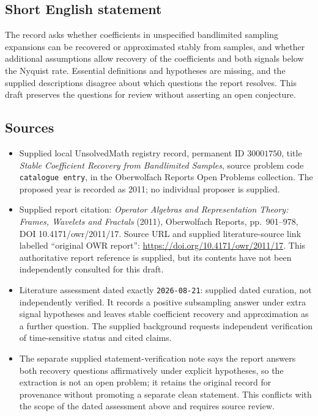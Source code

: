 \documentclass[11pt]{article}
\begin{document}
\subsection{Short English statement}
The record asks whether coefficients in unspecified bandlimited sampling expansions can be recovered or approximated stably from samples, and whether additional assumptions allow recovery of the coefficients and both signals below the Nyquist rate. Essential definitions and hypotheses are missing, and the supplied descriptions disagree about which questions the report resolves. This draft preserves the questions for review without asserting an open conjecture.
\subsection{Sources}
\begin{itemize}
\item Supplied local UnsolvedMath registry record, permanent ID \(30001750\), title \emph{Stable Coefficient Recovery from Bandlimited Samples}, source problem code \texttt{catalogue entry}, in the Oberwolfach Reports Open Problems collection. The proposed year is recorded as 2011; no individual proposer is supplied.
\item Supplied report citation: \emph{Operator Algebras and Representation Theory: Frames, Wavelets and Fractals} (2011), Oberwolfach Reports, pp.~901--978, DOI 10.4171/owr/2011/17. Source URL and supplied literature-source link labelled ``original OWR report'': \url{https://doi.org/10.4171/owr/2011/17}. This authoritative report reference is supplied, but its contents have not been independently consulted for this draft.
\item Literature assessment dated exactly \texttt{2026-08-21}: supplied dated curation, not independently verified. It records a positive subsampling answer under extra signal hypotheses and leaves stable coefficient recovery and approximation as a further question. The supplied background requests independent verification of time-sensitive status and cited claims.
\item The separate supplied statement-verification note says the report answers both recovery questions affirmatively under explicit hypotheses, so the extraction is not an open problem; it retains the original record for provenance without promoting a separate clean statement. This conflicts with the scope of the dated assessment above and requires source review.
\end{itemize}
\end{document}

